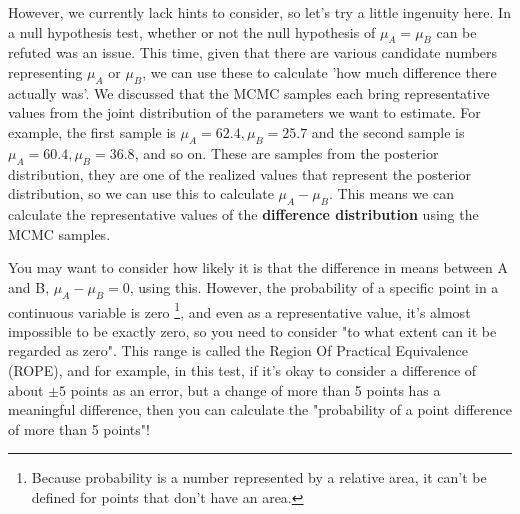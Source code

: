 \documentclass{ltjsbook}
\begin{document}
{%
However, we currently lack hints to consider, so let's try a little ingenuity here.
In a null hypothesis test, whether or not the null hypothesis of $\mu_A = \mu_B$ can be refuted was an issue. This time, given that there are various candidate numbers representing $\mu_A$ or $\mu_B$, we can use these to calculate 'how much difference there actually was'.
We discussed that the MCMC samples each bring representative values from the joint distribution of the parameters we want to estimate. For example, the first sample is $\mu_A = 62.4, \mu_B=25.7$ and the second sample is $\mu_A = 60.4,\mu_B=36.8$, and so on. These are samples from the posterior distribution, they are one of the realized values that represent the posterior distribution, so we can use this to calculate $\mu_A - \mu_B$. This means we can calculate the representative values of the \textbf{difference distribution} using the MCMC samples.

You may want to consider how likely it is that the difference in means between A and B, $\mu_A-\mu_B=0$, using this. However, the probability of a specific point in a continuous variable is zero \footnote {Because probability is a number represented by a relative area, it can't be defined for points that don't have an area.}, and even as a representative value, it's almost impossible to be exactly zero, so you need to consider "to what extent can it be regarded as zero". This range is called the Region Of Practical Equivalence (ROPE), and for example, in this test, if it's okay to consider a difference of about $\pm5$ points as an error, but a change of more than 5 points has a meaningful difference, then you can calculate the  "probability of a point difference of more than 5 points"!

}
\end{document}
